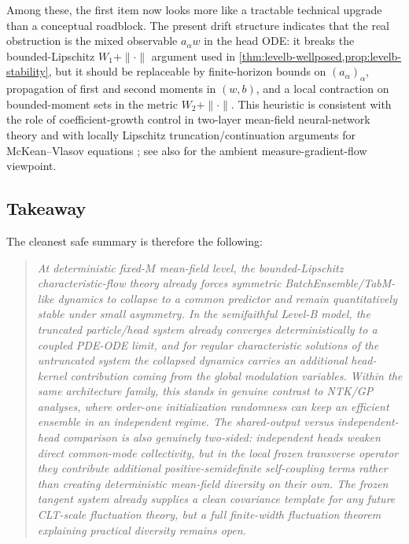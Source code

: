 \documentclass[11pt]{article}
\theoremstyle{definition}
\newcommand{\W}{W_1}
\begin{document}
Among these, the first item now looks more like a tractable technical upgrade than a conceptual roadblock.
The present drift structure indicates that the real obstruction is the mixed observable $a_\alpha w$ in the head ODE:
it breaks the bounded-Lipschitz $\W+\|\cdot\|$ argument used in
\cref{thm:levelb-wellposed,prop:levelb-stability},
but it should be replaceable by finite-horizon bounds on $(a_\alpha)_\alpha$,
propagation of first and second moments in $(w,b)$,
and a local contraction on bounded-moment sets in the metric $W_2+\|\cdot\|$.
This heuristic is consistent with the role of coefficient-growth control in two-layer mean-field neural-network theory \cite{mei2019}
and with locally Lipschitz truncation/continuation arguments for McKean--Vlasov equations \cite{erny2022};
see also \cite{chizat2018} for the ambient measure-gradient-flow viewpoint.

\subsection{Takeaway}

The cleanest safe summary is therefore the following:
\begin{quote}
\emph{At deterministic fixed-$M$ mean-field level, the bounded-Lipschitz characteristic-flow theory already forces symmetric BatchEnsemble/TabM-like dynamics to collapse to a common predictor and remain quantitatively stable under small asymmetry.
In the semifaithful Level-B model, the truncated particle/head system already converges deterministically to a coupled PDE-ODE limit, and for regular characteristic solutions of the untruncated system the collapsed dynamics carries an additional head-kernel contribution coming from the global modulation variables.
Within the same architecture family, this stands in genuine contrast to NTK/GP analyses, where order-one initialization randomness can keep an efficient ensemble in an independent regime.
The shared-output versus independent-head comparison is also genuinely two-sided:
independent heads weaken direct common-mode collectivity, but in the local frozen transverse operator they contribute additional positive-semidefinite self-coupling terms rather than creating deterministic mean-field diversity on their own.
The frozen tangent system already supplies a clean covariance template for any future CLT-scale fluctuation theory, but a full finite-width fluctuation theorem explaining practical diversity remains open.}
\end{quote}
\end{document}
